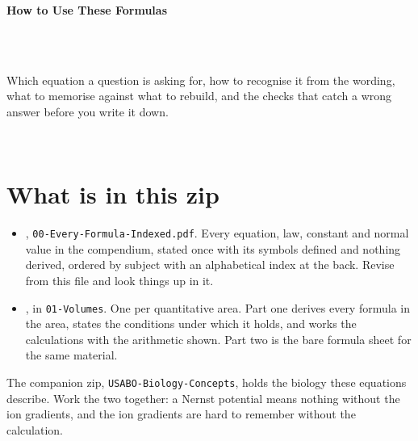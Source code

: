 


\begin{titlepage}\thispagestyle{empty}
\vspace*{0.14\textheight}
\noindent{\color{tiercat}\rule{\textwidth}{5pt}}\\[3pt]
\noindent{\color{bioline}\rule{\textwidth}{1pt}}\\[26pt]
\\[12pt]
\noindent\begin{minipage}{\textwidth}\raggedright
{\sffamily\bfseries\fontsize{30}{34}\selectfont\color{bioink}%
 \hyphenchar{} How to Use These Formulas\par}\end{minipage}\\[16pt]
\noindent{\color{biogreen}\rule{\textwidth}{1.4pt}}\\[10pt]
\noindent\begin{minipage}{\textwidth}\raggedright
{\fontsize{10.5}{14}\selectfont\color{biogreen}%
Which equation a question is asking for, how to recognise it from the wording, what to
memorise against what to rebuild, and the checks that catch a wrong answer before you
write it down.\par}\end{minipage}
\vfill
\noindent{\color{bioline}\rule{\textwidth}{1pt}}\\[3pt]
\noindent{\color{tiercat}\rule{\textwidth}{5pt}}
\end{titlepage}
\tableofcontents
\clearpage

\section{What is in this zip}

\begin{keybox}[title={The two kinds of file}]
\begin{itemize}
\item {}, \texttt{00-Every-Formula-Indexed.pdf}. Every
      equation, law, constant and normal value in the compendium, stated once with its
      symbols defined and nothing derived, ordered by subject with an alphabetical
      index at the back. Revise from this file and look things up in it.
\item {}, in \texttt{01-Volumes}. One per quantitative area. Part
      one derives every formula in the area, states the conditions under which it holds,
      and works the calculations with the arithmetic shown. Part two is the bare formula
      sheet for the same material.
\end{itemize}
The companion zip, \texttt{USABO-Biology-Concepts}, holds the biology these equations
describe. Work the two together: a Nernst potential means nothing without the ion
gradients, and the ion gradients are hard to remember without the calculation.
\end{keybox}

